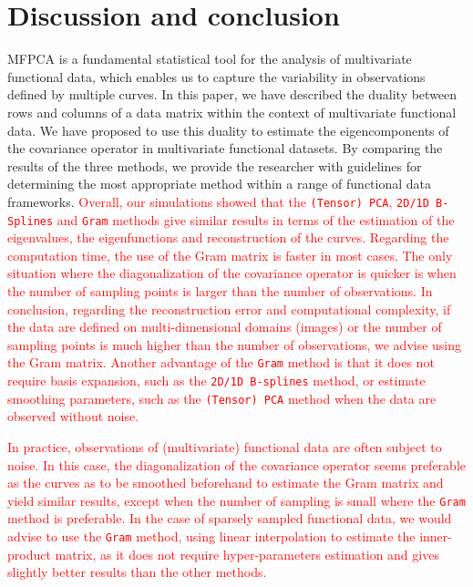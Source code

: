 \section{Discussion and conclusion} %
\label{sec:discussion}

MFPCA is a fundamental statistical tool for the analysis of multivariate functional data, which enables us to capture the variability in observations defined by multiple curves. In this paper, we have described the duality between rows and columns of a data matrix within the context of multivariate functional data. We have proposed to use this duality to estimate the eigencomponents of the covariance operator in multivariate functional datasets. By comparing the results of the three methods, we provide the researcher with guidelines for determining the most appropriate method within a range of functional data frameworks. 
\textcolor{red}{Overall, our simulations showed that the \texttt{(Tensor) PCA}, \texttt{2D/1D B-Splines} and \texttt{Gram} methods give similar results in terms of the estimation of the eigenvalues, the eigenfunctions and reconstruction of the curves. Regarding the computation time, the use of the Gram matrix is faster in most cases. The only situation where the diagonalization of the covariance operator is quicker is when the number of sampling points is larger than the number of observations.}
\textcolor{red}{In conclusion, regarding the reconstruction error and computational complexity, if the data are defined on multi-dimensional domains (images) or the number of sampling points is much higher than the number of observations, we advise using the Gram matrix. Another advantage of the \texttt{Gram} method is that it does not require basis expansion, such as the \texttt{2D/1D B-splines} method, or estimate smoothing parameters, such as the \texttt{(Tensor) PCA} method when the data are observed without noise.}

\textcolor{red}{In practice, observations of (multivariate) functional data are often subject to noise. In this case, the diagonalization of the covariance operator seems preferable as the curves as to be smoothed beforehand to estimate the Gram matrix and yield similar results, except when the number of sampling is small where the \texttt{Gram} method is preferable. In the case of sparsely sampled functional data, we would advise to use the \texttt{Gram} method, using linear interpolation to estimate the inner-product matrix, as it does not require hyper-parameters estimation and gives slightly better results than the other methods.}

